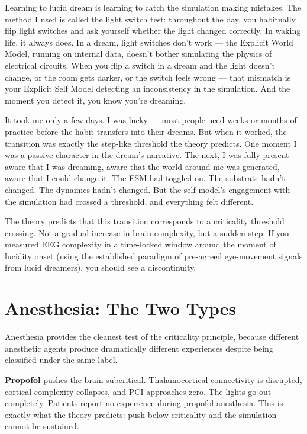 \documentclass[11pt, twoside, openright]{book}
\begin{document}
Learning to lucid dream is learning to catch the simulation making mistakes. The method I used is called the light switch test: throughout the day, you habitually flip light switches and ask yourself whether the light changed correctly. In waking life, it always does. In a dream, light switches don't work --- the Explicit World Model, running on internal data, doesn't bother simulating the physics of electrical circuits. When you flip a switch in a dream and the light doesn't change, or the room gets darker, or the switch feels wrong --- that mismatch is your Explicit Self Model detecting an inconsistency in the simulation. And the moment you detect it, you know you're dreaming.

It took me only a few days. I was lucky --- most people need weeks or months of practice before the habit transfers into their dreams. But when it worked, the transition was exactly the step-like threshold the theory predicts. One moment I was a passive character in the dream's narrative. The next, I was fully present --- aware that I was dreaming, aware that the world around me was generated, aware that I could change it. The ESM had toggled on. The substrate hadn't changed. The dynamics hadn't changed. But the self-model's engagement with the simulation had crossed a threshold, and everything felt different.

The theory predicts that this transition corresponds to a criticality threshold crossing. Not a gradual increase in brain complexity, but a sudden step. If you measured EEG complexity in a time-locked window around the moment of lucidity onset (using the established paradigm of pre-agreed eye-movement signals from lucid dreamers), you should see a discontinuity.

\section*{Anesthesia: The Two Types}

Anesthesia provides the cleanest test of the criticality principle, because different anesthetic agents produce dramatically different experiences despite being classified under the same label.

\textbf{Propofol} pushes the brain subcritical. Thalamocortical connectivity is disrupted, cortical complexity collapses, and PCI approaches zero. The lights go out completely. Patients report no experience during propofol anesthesia. This is exactly what the theory predicts: push below criticality and the simulation cannot be sustained.
\end{document}
